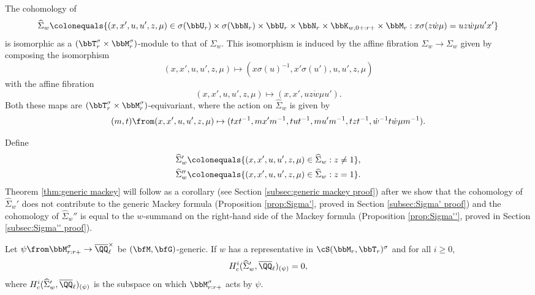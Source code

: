 \begin{lemma}\label{lem:Sigma hat}
  The cohomology of
  \begin{equation*}
    \widehat \Sigma_w \colonequals \{(x,x',u,u',z,\mu) \in \sigma(\bbU_r) \times \sigma(\bbN_r) \times \bbU_r \times \bbN_r \times \bbK_{w,0+:r+} \times \bbM_r : x \sigma(z \dot w \mu) = u z \dot w \mu u' x'\}
  \end{equation*}
  is isomorphic as a $(\bbT_r^\sigma \times \bbM_r^\sigma)$-module to that of $\Sigma_w$. This isomorphism is induced by the affine fibration $\widehat \Sigma_w \to \Sigma_w$ given by composing the isomorphism
  \begin{equation*}
    (x,x',u,u',z,\mu) \mapsto (x\sigma(u)^{-1}, x'\sigma(u'), u,u',z,\mu)   
  \end{equation*}
  with the affine fibration
  \begin{equation*}
    (x,x',u,u',z,\mu) \mapsto (x,x',uz \dot w \mu u').
  \end{equation*}
  Both these maps are $(\bbT_r^\sigma \times \bbM_r^\sigma)$-equivariant, where the action on $\widehat \Sigma_w$ is given by
  \begin{equation}\label{eq:action}
    (m,t) \from (x,x',u,u',z,\mu) \mapsto (txt^{-1}, mx'm^{-1}, tut^{-1}, mu'm^{-1}, tzt^{-1}, \dot w^{-1} t \dot w \mu m^{-1}).
  \end{equation}
\end{lemma}


Define
\begin{align*}
  \widehat \Sigma_w' &\colonequals \{(x,x',u,u',z,\mu) \in \widehat \Sigma_w : z \neq 1\}, \\
  \widehat \Sigma_w'' &\colonequals \{(x,x',u,u',z,\mu) \in \widehat \Sigma_w : z = 1\}.
\end{align*}
Theorem \ref{thm:generic mackey} will follow as a corollary (see Section \ref{subsec:generic mackey proof}) after we show that the cohomology of $\widehat \Sigma_w'$ does not contribute to the generic Mackey formula (Proposition \ref{prop:Sigma'}, proved in Section \ref{subsec:Sigma' proof}) and the cohomology of $\widehat \Sigma_w''$ is equal to the $w$-summand on the right-hand side of the Mackey formula (Proposition \ref{prop:Sigma''}, proved in Section \ref{subsec:Sigma'' proof}).

\begin{proposition}\label{prop:Sigma'}
  Let $\psi \from \bbM_{r:r+}^\sigma \to \overline \QQ_\ell^\times$ be $(\bfM,\bfG)$-generic. If $w$ has a representative in $\cS(\bbM_r, \bbT_r)^\sigma$ and for all $i \geq 0$,
  \begin{equation*}
    H_c^i(\widehat \Sigma_w', \overline \QQ_\ell)_{(\psi)} = 0,
  \end{equation*}
  where $H_c^i(\widehat \Sigma_w', \overline \QQ_\ell)_{(\psi)}$ is the subspace on which $\bbM_{r:r+}^\sigma$ acts by $\psi$.
\end{proposition}

